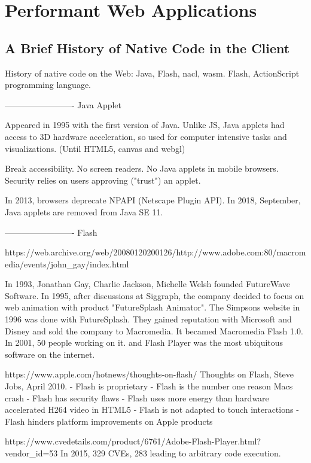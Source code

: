\chapter{Performant Web Applications}%
\label{cha:performant_web_applications}

\minitoc%

\section{A Brief History of Native Code in the Client}%
\label{sec:native_client}

History of native code on the Web: Java, Flash, nacl, wasm.
Flash, ActionScript programming language.

------------------------- Java Applet

Appeared in 1995 with the first version of Java.
Unlike JS, Java applets had access to 3D hardware acceleration,
so used for computer intensive tasks and visualizations.
(Until HTML5, canvas and webgl)

Break accessibility. No screen readers.
No Java applets in mobile browsers.
Security relies on users approving ("trust") an applet.


In 2013, browsers deprecate NPAPI (Netscape Plugin API).
In 2018, September, Java applets are removed from Java SE 11.


------------------------- Flash

https://web.archive.org/web/20080120200126/http://www.adobe.com:80/macromedia/events/john\_gay/index.html

In 1993, Jonathan Gay, Charlie Jackson, Michelle Welsh founded FutureWave Software.
In 1995, after discussions at Siggraph,
the company decided to focus on web animation with product "FutureSplash Animator".
The Simpsons website in 1996 was done with FutureSplash.
They gained reputation with Microsoft and Disney and sold the company to Macromedia.
It becamed Macromedia Flash 1.0.
In 2001, 50 people working on it. and Flash Player was the most ubiquitous software on the internet.

https://www.apple.com/hotnews/thoughts-on-flash/
Thoughts on Flash, Steve Jobs, April 2010.
 - Flash is proprietary
 - Flash is the number one reason Macs crash
 - Flash has security flaws
 - Flash uses more energy than hardware accelerated H264 video in HTML5
 - Flash is not adapted to touch interactions
 - Flash hinders platform improvements on Apple products

https://www.cvedetails.com/product/6761/Adobe-Flash-Player.html?vendor\_id=53
In 2015, 329 CVEs, 283 leading to arbitrary code execution.

